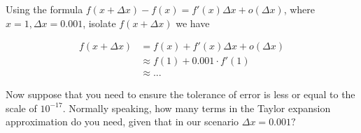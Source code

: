\documentclass{homework}
\newcommand{\?}{\stackrel{?}{=}}
\theoremstyle{definition}
\begin{document}
Using the formula $f(x+\Delta x)-f(x)=f'(x)\Delta x+o(\Delta x)$, where $x=1, \Delta x=0.001$, isolate $f(x+\Delta x)$ we have

\begin{align*}
    f(x+\Delta x) &= f(x) + f'(x)\Delta x + o(\Delta x)\\
    &\approx f(1) + 0.001\cdot f'(1)\\
    &\approx ...
\end{align*}

\question[2] Now suppose that you need to ensure the tolerance of error is less or equal to the scale of $10^{-17}$. Normally speaking, how many terms in the Taylor expansion approximation do you need, given that in our scenario $\Delta x=0.001?$
\end{document}
